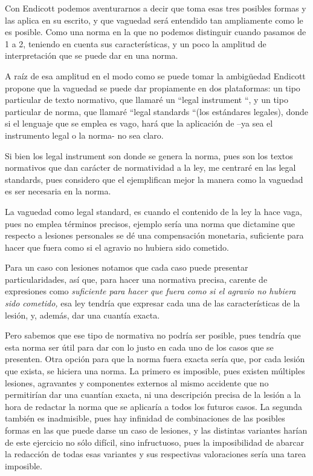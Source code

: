 \documentclass[]{book}
\begin{document}
Con Endicott podemos aventurarnos a decir que toma esas tres posibles
formas y las aplica en su escrito, y que vaguedad será entendido tan
ampliamente como le es posible. Como una norma en la que no podemos
distinguir cuando pasamos de 1 a 2, teniendo en cuenta sus
características, y un poco la amplitud de interpretación que se puede
dar en una norma.

A raíz de esa amplitud en el modo como se puede tomar la ambigüedad
Endicott propone que la vaguedad se puede dar propiamente en dos
plataformas: un tipo particular de texto normativo, que llamaré un
``legal instrument ``, y un tipo particular de norma, que llamaré
``legal standards ``(los estándares legales), donde si el lenguaje que
se emplea es vago, hará que la aplicación de --ya sea el instrumento
legal o la norma- no sea claro.

Si bien los legal instrument son donde se genera la norma, pues son los
textos normativos que dan carácter de normatividad a la ley, me centraré
en las legal standards, pues considero que el ejemplifican mejor la
manera como la vaguedad es ser necesaria en la norma.

La vaguedad como legal standard, es cuando el contenido de la ley la
hace vaga, pues no emplea términos precisos, ejemplo sería una norma que
dictamine que respecto a lesiones personales se dé una compensación
monetaria, suficiente para hacer que fuera como si el agravio no hubiera
sido cometido.

Para un caso con lesiones notamos que cada caso puede presentar
particularidades, así que, para hacer una normativa precisa, carente de
expresiones como \emph{suficiente para hacer que fuera como si el
agravio no hubiera sido cometido,} esa ley tendría que expresar cada una
de las características de la lesión, y, además, dar una cuantía exacta.

Pero sabemos que ese tipo de normativa no podría ser posible, pues
tendría que esta norma ser útil para dar con lo justo en cada uno de los
casos que se presenten. Otra opción para que la norma fuera exacta sería
que, por cada lesión que exista, se hiciera una norma. La primero es
imposible, pues existen múltiples lesiones, agravantes y componentes
externos al mismo accidente que no permitirían dar una cuantían exacta,
ni una descripción precisa de la lesión a la hora de redactar la norma
que se aplicaría a todos los futuros casos. La segunda también es
inadmisible, pues hay infinidad de combinaciones de las posibles formas
en las que puede darse un caso de lesiones, y las distintas variantes
harían de este ejercicio no sólo difícil, sino infructuoso, pues la
imposibilidad de abarcar la redacción de todas esas variantes y sus
respectivas valoraciones sería una tarea imposible.
\end{document}
